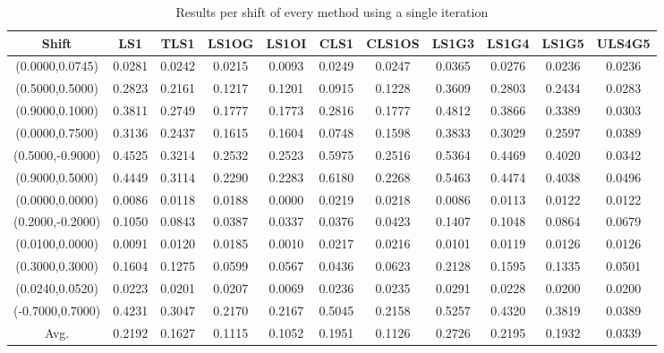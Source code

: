 \begin{table}[ht!]
\centering
\begin{tabular}{c|c|c|c|c|c|c|c|c|c|c}
Shift & \scriptsize{LS1} & \scriptsize{TLS1} & \scriptsize{LS1OG} & \scriptsize{LS1OI} & \scriptsize{CLS1} & \scriptsize{CLS1OS} & \scriptsize{LS1G3} & \scriptsize{LS1G4} & \scriptsize{LS1G5} & \scriptsize{ULS4G5}\\ \hline 
(0.0000,0.0745) & 0.0281 & 0.0242 & 0.0215 & 0.0093 & 0.0249 & 0.0247 & 0.0365 & 0.0276 & 0.0236 & 0.0236 \\ \hline
(0.5000,0.5000) & 0.2823 & 0.2161 & 0.1217 & 0.1201 & 0.0915 & 0.1228 & 0.3609 & 0.2803 & 0.2434 & 0.0283 \\ \hline
(0.9000,0.1000) & 0.3811 & 0.2749 & 0.1777 & 0.1773 & 0.2816 & 0.1777 & 0.4812 & 0.3866 & 0.3389 & 0.0303 \\ \hline
(0.0000,0.7500) & 0.3136 & 0.2437 & 0.1615 & 0.1604 & 0.0748 & 0.1598 & 0.3833 & 0.3029 & 0.2597 & 0.0389 \\ \hline
(0.5000,-0.9000) & 0.4525 & 0.3214 & 0.2532 & 0.2523 & 0.5975 & 0.2516 & 0.5364 & 0.4469 & 0.4020 & 0.0342 \\ \hline
(0.9000,0.5000) & 0.4449 & 0.3114 & 0.2290 & 0.2283 & 0.6180 & 0.2268 & 0.5463 & 0.4474 & 0.4038 & 0.0496 \\ \hline
(0.0000,0.0000) & 0.0086 & 0.0118 & 0.0188 & 0.0000 & 0.0219 & 0.0218 & 0.0086 & 0.0113 & 0.0122 & 0.0122 \\ \hline
(0.2000,-0.2000) & 0.1050 & 0.0843 & 0.0387 & 0.0337 & 0.0376 & 0.0423 & 0.1407 & 0.1048 & 0.0864 & 0.0679 \\ \hline
(0.0100,0.0000) & 0.0091 & 0.0120 & 0.0185 & 0.0010 & 0.0217 & 0.0216 & 0.0101 & 0.0119 & 0.0126 & 0.0126 \\ \hline
(0.3000,0.3000) & 0.1604 & 0.1275 & 0.0599 & 0.0567 & 0.0436 & 0.0623 & 0.2128 & 0.1595 & 0.1335 & 0.0501 \\ \hline
(0.0240,0.0520) & 0.0223 & 0.0201 & 0.0207 & 0.0069 & 0.0236 & 0.0235 & 0.0291 & 0.0228 & 0.0200 & 0.0200 \\ \hline
(-0.7000,0.7000) & 0.4231 & 0.3047 & 0.2170 & 0.2167 & 0.5045 & 0.2158 & 0.5257 & 0.4320 & 0.3819 & 0.0389 \\ \hline
Avg.  & 0.2192 & 0.1627 & 0.1115 & 0.1052 & 0.1951 & 0.1126 & 0.2726 & 0.2195 & 0.1932 & 0.0339 \\ \hline
\end{tabular}
\caption{Results per shift of every method using a single iteration}
\label{tab:1itperShift}
\end{table}


